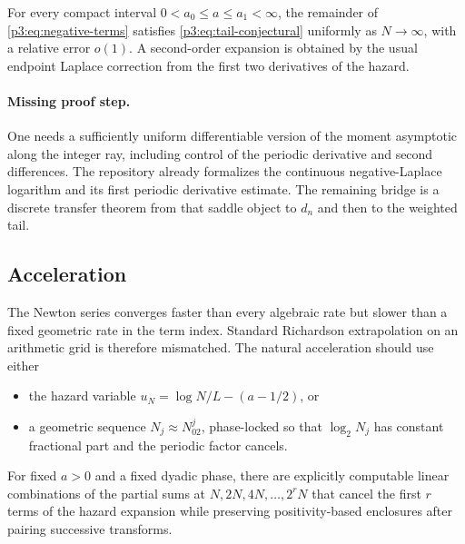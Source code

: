 \documentclass[11pt,oneside]{article}
\theoremstyle{definition}
\theoremstyle{remark}
\newcommand{\1}{\mathbf 1}
\begin{document}
\begin{conjecture}
\label{p3:conj:tail}
For every compact interval $0<a_0\le a\le a_1<\infty$, the remainder of
\eqref{p3:eq:negative-terms} satisfies \eqref{p3:eq:tail-conjectural} uniformly as $N\to\infty$,
with a relative error $o(1)$.  A second-order expansion is obtained by the usual endpoint
Laplace correction from the first two derivatives of the hazard.
\end{conjecture}

\paragraph{Missing proof step.}
One needs a sufficiently uniform differentiable version of the moment asymptotic along the
integer ray, including control of the periodic derivative and second differences.  The
repository already formalizes the continuous negative-Laplace logarithm and its first
periodic derivative estimate.  The remaining bridge is a discrete transfer theorem from
that saddle object to $d_n$ and then to the weighted tail.

\subsection{Acceleration}

The Newton series converges faster than every algebraic rate but slower than a fixed
geometric rate in the term index.  Standard Richardson extrapolation on an arithmetic grid
is therefore mismatched.  The natural acceleration should use either

\begin{itemize}
\item the hazard variable $u_N=\log N/L-(a-1/2)$, or
\item a geometric sequence $N_j\approx N_02^j$, phase-locked so that
      $\log_2N_j$ has constant fractional part and the periodic factor cancels.
\end{itemize}

\begin{conjecture}
For fixed $a>0$ and a fixed dyadic phase, there are explicitly computable linear
combinations of the partial sums at $N,2N,4N,\ldots,2^rN$ that cancel the first $r$
terms of the hazard expansion while preserving positivity-based enclosures after pairing
successive transforms.
\end{conjecture}
\end{document}
